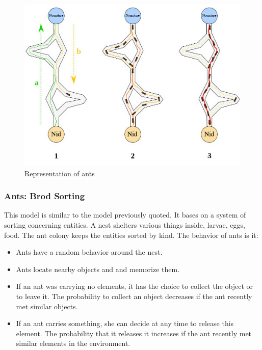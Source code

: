 \begin{figure}[h]
\center
\includegraphics{../images/SchemaFourmi.png}
\caption{\label{AntsRepresentation}Representation of ants}
\end{figure}

\newpage

\subsubsection{Ants: Brod Sorting}

This model is similar to the model previously quoted. It bases on a system of sorting concerning entities. A nest shelters various things inside, larvae, eggs, food. The ant colony keeps the entities sorted by kind.
The behavior of ants is it:

\begin{itemize}
\item Ants have a random behavior around the nest.
\item Ants locate nearby objects and and memorize them.
\item If an ant was carrying no elements, it has the choice to collect the object or to leave it. The probability to collect an object decreases if the ant recently met similar objects.
\item If an ant carries something, she can decide at any time to release this element. The probability that it releases it increases if the ant recently met similar elements in the environment.
\end{itemize}

\newpage

